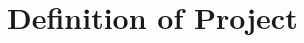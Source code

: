 \chapter{Definition of Project}
\begin{figure}[H]
\centering
\setlength\fboxsep{0pt}
\setlength\fboxrule{0.5pt}
\end{figure}

